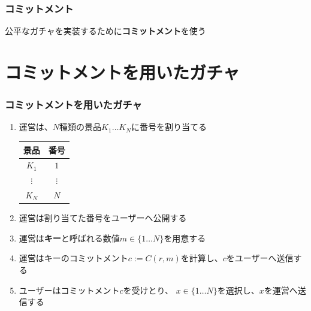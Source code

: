 \begin{frame}
  \frametitle{コミットメント}

  公平なガチャを実装するために\textbf{コミットメント}を使う


\end{frame}


\section{コミットメントを用いたガチャ}

\begin{frame}
  \frametitle{コミットメントを用いたガチャ}
  
  \begin{enumerate}
    \item<2-> \label{item:assign}
      運営は、$N$種類の景品$K_1 \dots K_N$に番号を割り当てる
      \begin{table}[h]
        \begin{tabular}{c|c}
          景品 & 番号 \\
          \hline \hline
          $K_1$ & $1$ \\
          $\vdots$ & $\vdots$ \\
          $K_N$ & $N$ \\
        \end{tabular}
      \end{table}
    \item<3-> 運営は割り当てた番号をユーザーへ公開する
    \item<4-> 運営は\textbf{キー}と呼ばれる数値$m \in \{1 \dots N\}$を用意する
    \item<5-> 運営はキーのコミットメント$c := C(r, m)$を計算し、$c$をユーザーへ送信する
    \item<6-> ユーザーはコミットメント$c$を受けとり、
      $x \in \{1 \dots N\}$を選択し、$x$を運営へ送信する
  \end{enumerate}
\end{frame}

